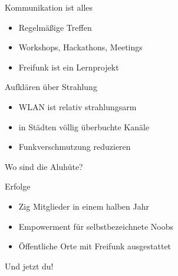 \documentclass[aspectratio=1610]{beamer}
\begin{document}
\begin{frame}
  Kommunikation ist alles
  \begin{itemize}
    \pause
    \item Regelmäßige Treffen
    \pause
    \item Workshops, Hackathons, Meetings
    \pause
    \item Freifunk ist ein Lernprojekt
  \end{itemize}
\end{frame}

\begin{frame}
  Aufklären über Strahlung
  \begin{itemize}
    \pause
    \item WLAN ist relativ strahlungsarm
    \pause
    \item in Städten völlig überbuchte Kanäle
    \pause
    \item Funkverschmutzung reduzieren
  \end{itemize}
  \pause
  Wo sind die Aluhüte?
\end{frame}

\begin{frame}
  Erfolge
  \begin{itemize}
    \pause
    \item Zig Mitglieder in einem halben Jahr
    \pause
    \item Empowerment für selbstbezeichnete Noobs
    \pause
    \item Öffentliche Orte mit Freifunk ausgestattet
  \end{itemize}
\end{frame}

\begin{frame}
  \Huge\center
  Und jetzt du!
\end{frame}
\end{document}
